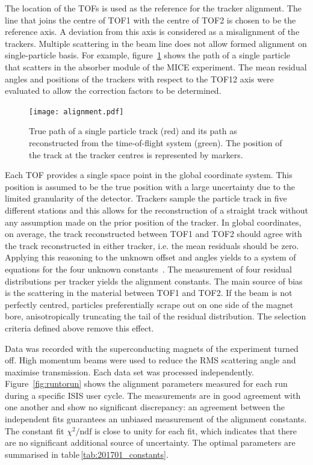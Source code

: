 The location of the TOFs is used as the reference for the tracker alignment. The line that joins the centre of TOF1 with the centre of TOF2 is chosen to be the reference axis. A deviation from this axis is considered as a misalignment of the trackers. Multiple scattering in the beam line does not allow formed alignment on single-particle basis. For example, figure~\ref{fig:align_bl} shows the path of a single particle that scatters in the absorber module of the MICE experiment.
 The mean residual angles and positions of the trackers with respect to the TOF12 axis were evaluated to allow the correction factors to be determined.

\begin{figure}
	\begin{center}
		\texttt{[image: alignment.pdf]}
	\end{center}
	\caption{
		True path of a single particle track (red) and its path as reconstructed from the time-of-flight system (green). The position of the track at the tracker centres is represented by markers.
	}
	\label{fig:align_bl}
\end{figure}

Each TOF provides a single space point in the global coordinate system. This position is assumed to be the true position with a large uncertainty due to the limited granularity of the detector.
Trackers sample the particle track in five different stations and this allows for the reconstruction of a straight track without any assumption made on the prior position of the tracker.
In global coordinates, on average, the track reconstructed between TOF1 and TOF2 should agree with the track reconstructed in either tracker, i.e. the mean residuals should be zero. Applying this reasoning to the unknown offset and angles yields to a system of equations for the four unknown constants~\cite{2018arXiv1805.06623T}.
The measurement of four residual distributions per tracker yields the alignment constants.
The main source of bias is the scattering in the material between TOF1 and TOF2. If the beam is not perfectly centred, particles preferentially scrape out on one side of the magnet bore, anisotropically truncating the tail of the residual distribution. The selection criteria defined above remove this effect.

Data was recorded with the superconducting magnets of the experiment turned off. High momentum beams were used to reduce the RMS scattering angle and maximise transmission.  
Each data set was processed independently. Figure~\ref{fig:runtorun} shows the alignment parameters measured for each run during a specific ISIS user cycle. The measurements are in good agreement with one another and show no significant discrepancy: an agreement between the independent fits guarantees an unbiased measurement of the alignment constants. The constant fit $\chi^2/\text{ndf}$ is close to unity for each fit, which indicates that there are no significant additional source of uncertainty. The optimal parameters are summarised in table\,\ref{tab:201701_constants}. 


